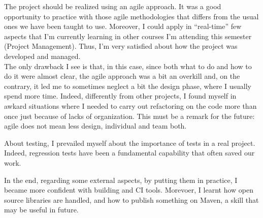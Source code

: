 \bigskip
The project should be realized using an agile approach. It was a good opportunity to practice with those agile methodologies that differs from the usual ones we have been taught to use.
Moreover, I could apply in ``real-time'' few aspects that I'm currently learning in other courses I'm attending this semester (Project Management).
Thus, I'm very satisfied about how the project was developed and managed.
\\
The only drawback I see is that, in this case, since both what to do and how to do it were almost clear, the agile approach was a bit an overkill and, on the contrary, it led me to sometimes neglect a bit the design phase, where I usually spend more time. Indeed, differently from other projects, I found myself in awkard situations where I needed to carry out refactoring on the code more than once just because of lacks of organization. This must be a remark for the future: agile does not mean less design, individual and team both.

\bigskip
About testing, I prevailed myself about the importance of tests in a real project. Indeed, regression tests have been a fundamental capability that often saved our work.

\bigskip
In the end, regarding some external aspects, by putting them in practice, I became more confident with building and CI tools. Morevoer, I learnt how open source libraries are handled, and how to publish something on Maven, a skill that may be useful in future.  
 
 








